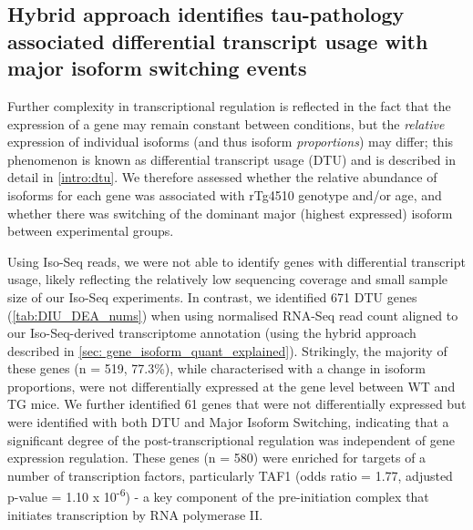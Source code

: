 \clearpage
\subsection{Hybrid approach identifies tau-pathology associated differential transcript usage with major isoform switching events}
Further complexity in transcriptional regulation is reflected in the fact that the expression of a gene may remain constant between conditions, but the \textit{relative} expression of individual isoforms (and thus isoform \textit{proportions}) may differ; this phenomenon is known as differential transcript usage (DTU) and is described in detail in \cref{intro:dtu}. We therefore assessed whether the relative abundance of isoforms for each gene was associated with rTg4510 genotype and/or age, and whether there was switching of the dominant major (highest expressed) isoform between experimental groups. 

Using Iso-Seq reads, we were not able to identify genes with differential transcript usage, likely reflecting the relatively low sequencing coverage and small sample size of our Iso-Seq experiments. In contrast, we identified 671 DTU genes (\cref{tab:DIU_DEA_nums}) when using normalised RNA-Seq read count aligned to our Iso-Seq-derived transcriptome annotation (using the hybrid approach described in \cref{sec: gene_isoform_quant_explained}). Strikingly, the majority of these genes (n = 519, 77.3\%), while characterised with a change in isoform proportions, were not differentially expressed at the gene level between WT and TG mice. We further identified 61 genes that were not differentially expressed but were identified with both DTU and Major Isoform Switching, indicating that a significant degree of the post-transcriptional regulation was independent of gene expression regulation. These genes (n = 580) were enriched for targets of a number of transcription factors, particularly TAF1 (odds ratio = 1.77, adjusted p-value = 1.10 x 10\textsuperscript{-6}) - a key component of the pre-initiation complex that initiates transcription by RNA polymerase II\cite{Bieniossek2013}. 

